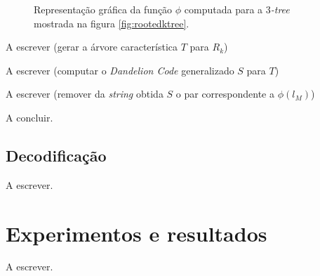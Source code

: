 \begin{algorithm}
\begin{step}
\begin{figure}
      \caption{Representação gráfica da função $\phi$ computada para a \emph{$3$-tree} mostrada na figura \ref{fig:rootedktree}.}
      \label{fig:phi}
    \end{figure}
  \end{step}

  \begin{step}
    A escrever (gerar a árvore característica $T$ para $R_k$) %
  \end{step}

  \begin{step}
    A escrever (computar o \emph{Dandelion Code} generalizado $S$ para $T$) %
  \end{step}

  \begin{step}
    A escrever (remover da \emph{string} obtida $S$ o par correspondente a $\phi(l_M)$) %
  \end{step}

  A concluir. %
\end{algorithm}

\subsection{Decodificação}

A escrever. %

\section{Experimentos e resultados}

A escrever. %

